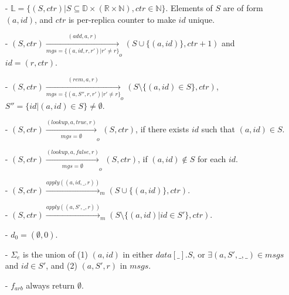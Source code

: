 {\color {red}
\begin{itemize}
\setlength{\itemsep}{0.5pt}
\item[-] $\mathbb{L} = \{ (S,\mathit{ctr}) \vert S \subseteq \mathbb{D} \times (\mathbb{R} \times \mathbb{N}), \mathit{ctr} \in \mathbb{N} \}$. Elements of $S$ are of form $(a,id)$, and $\mathit{ctr}$ is per-replica counter to make $id$ unique.

\item[-] $(S,\mathit{ctr}) \xrightarrow[\mathit{mgs} = \{ (a,\mathit{id},r,r') \vert r' \neq r \}]{(\mathit{add},a,r)}_o (S \cup \{ (a,\mathit{id}) \}, \mathit{ctr}+1)$ and $\mathit{id} = (r,\mathit{ctr})$.

\item[-] $(S,\mathit{ctr}) \xrightarrow[\mathit{mgs} = \{ (a,S'',r,r') \vert r' \neq r \} ]{(\mathit{rem},a,r)}_o (S \setminus \{ (a,id) \in S \}, \mathit{ctr})$, $S'' = \{ id \vert (a,id) \in S \} \neq \emptyset$.

\item[-] $(S,\mathit{ctr}) \xrightarrow[\mathit{mgs} = \emptyset]{(\mathit{lookup},a,\mathit{true},r)}_o (S, \mathit{ctr})$, if there exists $\mathit{id}$ such that $(a,\mathit{id}) \in S$.

\item[-] $(S,\mathit{ctr}) \xrightarrow[\mathit{mgs} = \emptyset]{(\mathit{lookup},a,\mathit{false},r)}_o (S, \mathit{ctr})$, if $(a,\mathit{id}) \notin S$ for each $\mathit{id}$.

\item[-] $(S,\mathit{ctr}) \xrightarrow{\mathit{apply}((a,id,\_,r))}_m (S \cup \{ (a,id) \}, \mathit{ctr})$.

\item[-] $(S,\mathit{ctr}) \xrightarrow{\mathit{apply}((a,S',\_,r))}_m (S \setminus \{ (a,id) \vert id \in S' \}, \mathit{ctr})$.

\item[-] $d_0 = (\emptyset,0)$.

\item[-] $\Sigma_e$ is the union of (1) $(a,id)$ in either $\mathit{data}[\_].S$, or $\exists (a,S',\_,\_) \in \mathit{msgs}$ and $id \in S'$, and (2) $(a,S',r)$ in $\mathit{msgs}$.

\item[-] $f_{\mathit{arb}}$ always return $\emptyset$.
\end{itemize}
}


